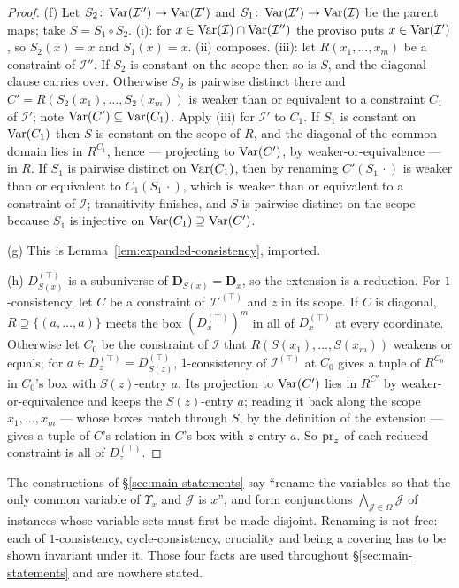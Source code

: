 \begin{proof}
(f) Let $S_{2}\colon\operatorname{Var}(\mathcal I'')\to\operatorname{Var}(\mathcal I')$ and
$S_{1}\colon\operatorname{Var}(\mathcal I')\to\operatorname{Var}(\mathcal I)$ be the parent maps; take
$S=S_{1}\circ S_{2}$. (i): for
$x\in\operatorname{Var}(\mathcal I)\cap\operatorname{Var}(\mathcal I'')$ the proviso puts
$x\in\operatorname{Var}(\mathcal I')$, so $S_{2}(x)=x$ and $S_{1}(x)=x$. (ii) composes.
(iii): let $R(x_{1},\dots,x_{m})$ be a constraint of $\mathcal I''$. If
$S_{2}$ is constant on the scope then so is $S$, and the diagonal clause
carries over. Otherwise $S_{2}$ is pairwise distinct there and
$C'=R(S_{2}(x_{1}),\dots,S_{2}(x_{m}))$ is weaker than or equivalent to a
constraint $C_{1}$ of $\mathcal I'$; note
$\operatorname{Var}(C')\subseteq\operatorname{Var}(C_{1})$. Apply (iii) for $\mathcal I'$ to $C_{1}$. If
$S_{1}$ is constant on $\operatorname{Var}(C_{1})$ then $S$ is constant on the scope of
$R$, and the diagonal of the common domain lies in $R^{C_{1}}$, hence ---
projecting to $\operatorname{Var}(C')$, by weaker-or-equivalence --- in $R$. If $S_{1}$ is
pairwise distinct on $\operatorname{Var}(C_{1})$, then by renaming
$C'(S_{1}\,\cdot)$ is weaker than or equivalent to $C_{1}(S_{1}\,\cdot)$,
which is weaker than or equivalent to a constraint of $\mathcal I$;
transitivity finishes, and $S$ is pairwise distinct on the scope because
$S_{1}$ is injective on $\operatorname{Var}(C_{1})\supseteq\operatorname{Var}(C')$.

(g) This is Lemma~\ref{lem:expanded-consistency}, imported.

(h) $D^{(\top)}_{S(x)}$ is a subuniverse of $\mathbf D_{S(x)}=\mathbf D_{x}$,
so the extension is a reduction. For $1$-consistency, let $C$ be a constraint
of $\mathcal I'^{(\top)}$ and $z$ in its scope. If $C$ is diagonal,
$R\supseteq\{(a,\dots,a)\}$ meets the box $(D^{(\top)}_{x})^{m}$ in all of
$D^{(\top)}_{x}$ at every coordinate. Otherwise let $C_{0}$ be the constraint
of $\mathcal I$ that $R(S(x_{1}),\dots,S(x_{m}))$ weakens or equals; for
$a\in D^{(\top)}_{z}=D^{(\top)}_{S(z)}$, $1$-consistency of
$\mathcal I^{(\top)}$ at $C_{0}$ gives a tuple of
$R^{C_{0}}$ in $C_{0}$'s box with $S(z)$-entry $a$. Its projection to
$\operatorname{Var}(C')$ lies in $R^{C'}$ by weaker-or-equivalence and keeps the
$S(z)$-entry $a$; reading it back along the scope $x_{1},\dots,x_{m}$ ---
whose boxes match through $S$, by the definition of the extension --- gives a
tuple of $C$'s relation in $C$'s box with $z$-entry $a$. So
$\operatorname*{pr}_{z}$ of each reduced constraint is all of $D^{(\top)}_{z}$.
\end{proof}

\begin{hazard}\label{haz:renaming}
The constructions of \S\ref{sec:main-statements} say ``rename the variables so
that the only common variable of $\Upsilon_{x}$ and $\mathcal J$ is $x$'', and
form conjunctions $\bigwedge_{\mathcal J\in\Omega}\mathcal J$ of instances
whose variable sets must first be made disjoint. Renaming is not free: each of
$1$-consistency, cycle-consistency, cruciality and being a covering has to be
shown invariant under it. Those four facts are used throughout
\S\ref{sec:main-statements} and are nowhere stated.
\end{hazard}


